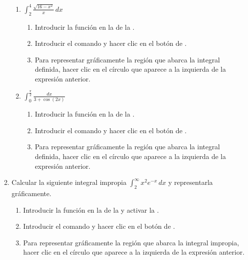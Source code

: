 \begin{enumerate}[leftmargin=*]
\begin{enumerate}
      \item $\displaystyle \int_2^4 \frac{\sqrt{16-x^{2}}}{x}\,dx$
            \begin{indication}
            \begin{enumerate}
            \item Introducir la función  en la  de la .
            \item Introducir el comando  y hacer clic en el botón de .
            \item Para representar gráficamente la región que abarca la integral definida, hacer clic en el círculo que aparece a la izquierda de la expresión anterior.
            \end{enumerate}
            \end{indication}

      \item $\displaystyle \int_0^{\frac{\pi}{2}} \frac{dx}{3+\cos(2x)}$
            \begin{indication}
            \begin{enumerate}
            \item Introducir la función  en la  de la .
            \item Introducir el comando  y hacer clic en el botón de .
            \item Para representar gráficamente la región que abarca la integral definida, hacer clic en el círculo que aparece a la izquierda de la expresión anterior.
            \end{enumerate}
            \end{indication}
      \end{enumerate}

\item Calcular la siguiente integral impropia $\int_2^{\infty} x^2e^{-x}\,dx$ y representarla gráficamente.
      \begin{indication}
      \begin{enumerate}
      \item Introducir la función  en la  de la  y activar la .
      \item Introducir el comando  y hacer clic en el botón de .
      \item Para representar gráficamente la región que abarca la integral impropia, hacer clic en el círculo que aparece a la izquierda de la expresión anterior.
      \end{enumerate}
      \end{indication}



\end{enumerate}
